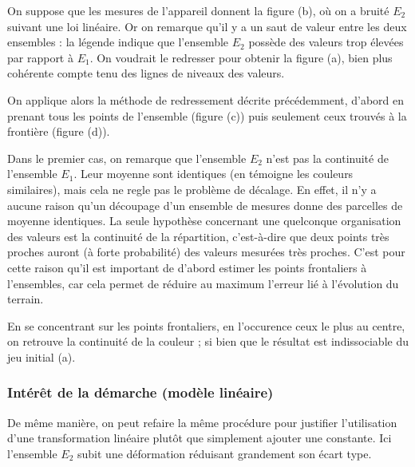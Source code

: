 \documentclass[12pt]{article}
\begin{document}
    On suppose que les mesures de l'appareil donnent la figure (b), où on a bruité $E_2$ suivant une loi linéaire. Or on remarque qu'il y a un saut de valeur entre les deux ensembles : la légende indique que l'ensemble $E_2$ possède des valeurs trop élevées par rapport à $E_1$. On voudrait le redresser pour obtenir la figure (a), bien plus cohérente compte tenu des lignes de niveaux des valeurs.

    On applique alors la méthode de redressement décrite précédemment, d'abord en prenant tous les points de l'ensemble (figure (c)) puis seulement ceux trouvés à la frontière (figure (d)).

    Dans le premier cas, on remarque que l'ensemble $E_2$ n'est pas la continuité de l'ensemble $E_1$. Leur moyenne sont identiques (en témoigne les couleurs similaires), mais cela ne regle pas le problème de décalage. En effet, il n'y a aucune raison qu'un découpage d'un ensemble de mesures donne des parcelles de moyenne identiques. La seule hypothèse concernant une quelconque organisation des valeurs est la continuité de la répartition, c'est-à-dire que deux points très proches auront (à forte probabilité) des valeurs mesurées très proches. C'est pour cette raison qu'il est important de d'abord estimer les points frontaliers à l'ensembles, car cela permet de réduire au maximum l'erreur lié à l'évolution du terrain.

    En se concentrant sur les points frontaliers, en l'occurence ceux le plus au centre, on retrouve la continuité de la couleur ; si bien que le résultat est indissociable du jeu initial (a).

\newpage
\subsubsection{Intérêt de la démarche (modèle linéaire)}

    De même manière, on peut refaire la même procédure pour justifier l'utilisation d'une transformation linéaire plutôt que simplement ajouter une constante. Ici l'ensemble $E_2$ subit une déformation réduisant grandement son écart type.
\end{document}
